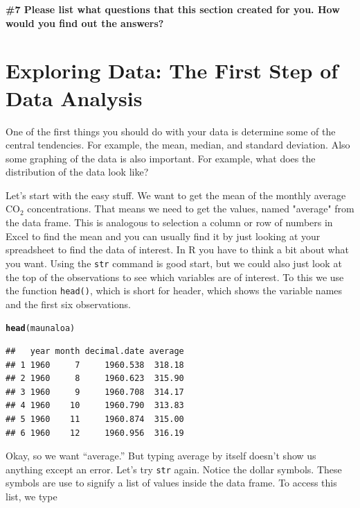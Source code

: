 \documentclass{tufte-handout}\usepackage[]{graphicx}\usepackage[]{xcolor}
\makeatletter
\newcommand{\hlstd}[1]{\textcolor[rgb]{0.345,0.345,0.345}{#1}}%
\newcommand{\hlkwd}[1]{\textcolor[rgb]{0.737,0.353,0.396}{\textbf{#1}}}%
\newenvironment{kframe}{%
 \def\at@end@of@kframe{}%
 \ifinner\ifhmode%
  \def\at@end@of@kframe{\end{minipage}}%
  \begin{minipage}{\columnwidth}%
 \fi\fi%
 \def\FrameCommand##1{\hskip\@totalleftmargin \hskip-\fboxsep
 \colorbox{shadecolor}{##1}\hskip-\fboxsep
     \hskip-\linewidth \hskip-\@totalleftmargin \hskip\columnwidth}%
 \MakeFramed {\advance\hsize-\width
   \@totalleftmargin\z@ \linewidth\hsize
   \@setminipage}}%
 {\par\unskip\endMakeFramed%
 \at@end@of@kframe}
\newenvironment{knitrout}{}{} %
\makeatother
\begin{document}
\bigskip
\noindent \textbf{\#7 Please list what questions that this section created for you. How would you find out the answers? }
 
\section{Exploring Data: The First Step of Data Analysis}

One of the first things you should do with your data is determine some of the central tendencies. For example, the mean, median, and standard deviation. Also some graphing of the data is also important. For example, what does the distribution of the data look like? 

Let's start with the easy stuff. We want to get the mean of the monthly average CO$_2$ concentrations. That means we need to get the values, named "average" from the data frame. This is analogous to selection a column or row of numbers in Excel to find the mean and you can usually find it by just looking at your spreadsheet to find the data of interest. In R you have to think a bit about what you want. Using the \texttt{str} command is good start, but we could also just look at the top of the observations to see which variables are of interest. To this we use the function \texttt{head()}, which is short for header, which shows the variable names and the first six observations.

\begin{knitrout}
\color{fgcolor}\begin{kframe}
\begin{alltt}
\hlkwd{head}\hlstd{(maunaloa)}
\end{alltt}
\begin{verbatim}
##   year month decimal.date average
## 1 1960     7     1960.538  318.18
## 2 1960     8     1960.623  315.90
## 3 1960     9     1960.708  314.17
## 4 1960    10     1960.790  313.83
## 5 1960    11     1960.874  315.00
## 6 1960    12     1960.956  316.19
\end{verbatim}
\end{kframe}
\end{knitrout}

Okay, so we want ``average.'' But typing average by itself doesn't show us anything except an error. Let's try \texttt{str} again. Notice the dollar symbols.  These symbols are use to signify a list of values inside the data frame. To access this list, we type
\end{document}
